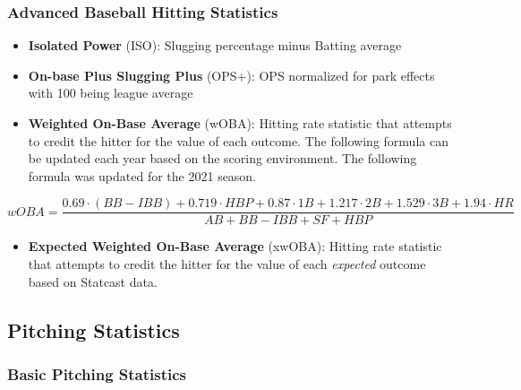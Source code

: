 \documentclass[
  11pt,
]{book}
\providecommand{\tightlist}{%
  \setlength{\itemsep}{0pt}\setlength{\parskip}{0pt}}
\theoremstyle{definition}
\theoremstyle{definition}
\theoremstyle{definition}
\theoremstyle{definition}
\theoremstyle{remark}
\begin{document}
\newpage

\hypertarget{advanced-baseball-hitting-statistics}{%
\subsubsection{Advanced Baseball Hitting Statistics}\label{advanced-baseball-hitting-statistics}}

\begin{itemize}
\item
  \textbf{Isolated Power} (ISO): Slugging percentage minus Batting average
\item
  \textbf{On-base Plus Slugging Plus} (OPS+): OPS normalized for park effects with 100 being league average
\item
  \textbf{Weighted On-Base Average} (wOBA): Hitting rate statistic that attempts to credit the hitter for the value of each outcome. The following formula can be updated each year based on the scoring environment. The following formula was updated for the 2021 season.
\end{itemize}

\[wOBA = \frac{0.69 \cdot (BB - IBB) + 0.719 \cdot HBP + 0.87 \cdot 1B + 1.217 \cdot 2B + 1.529 \cdot 3B + 1.94 \cdot HR}{AB + BB - IBB + SF + HBP}\]

\begin{itemize}
\tightlist
\item
  \textbf{Expected Weighted On-Base Average} (xwOBA): Hitting rate statistic that attempts to credit the hitter for the value of each \emph{expected} outcome based on Statcast data.
\end{itemize}

\hypertarget{pitching-statistics}{%
\subsection{Pitching Statistics}\label{pitching-statistics}}

\hypertarget{basic-pitching-statistics}{%
\subsubsection{Basic Pitching Statistics}\label{basic-pitching-statistics}}
\end{document}

